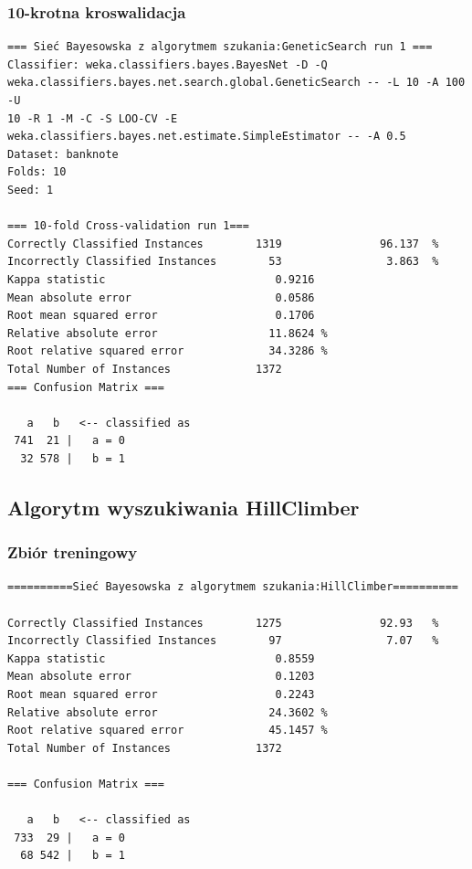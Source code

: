 \documentclass{classrep}
\begin{document}
\subsubsection*{10-krotna kroswalidacja}
\scriptsize 
\begin{verbatim}
=== Sieć Bayesowska z algorytmem szukania:GeneticSearch run 1 ===
Classifier: weka.classifiers.bayes.BayesNet -D -Q
weka.classifiers.bayes.net.search.global.GeneticSearch -- -L 10 -A 100 -U
10 -R 1 -M -C -S LOO-CV -E weka.classifiers.bayes.net.estimate.SimpleEstimator -- -A 0.5
Dataset: banknote
Folds: 10
Seed: 1

=== 10-fold Cross-validation run 1===
Correctly Classified Instances        1319               96.137  %
Incorrectly Classified Instances        53                3.863  %
Kappa statistic                          0.9216
Mean absolute error                      0.0586
Root mean squared error                  0.1706
Relative absolute error                 11.8624 %
Root relative squared error             34.3286 %
Total Number of Instances             1372     
=== Confusion Matrix ===

   a   b   <-- classified as
 741  21 |   a = 0
  32 578 |   b = 1
\end{verbatim} 
\normalsize

\subsection{Algorytm wyszukiwania HillClimber}
\subsubsection*{Zbiór treningowy}
\scriptsize 
\begin{verbatim}
==========Sieć Bayesowska z algorytmem szukania:HillClimber==========

Correctly Classified Instances        1275               92.93   %
Incorrectly Classified Instances        97                7.07   %
Kappa statistic                          0.8559
Mean absolute error                      0.1203
Root mean squared error                  0.2243
Relative absolute error                 24.3602 %
Root relative squared error             45.1457 %
Total Number of Instances             1372     

=== Confusion Matrix ===

   a   b   <-- classified as
 733  29 |   a = 0
  68 542 |   b = 1
\end{verbatim} 
\normalsize
\end{document}
